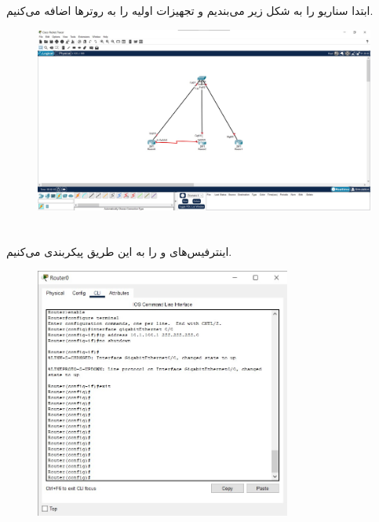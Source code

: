 \documentclass{article}
\begin{document}


\newpage



\section{}%
ابتدا سناریو را به شکل زیر می‌بندیم و تجهیزات اولیه را به روترها اضافه می‌کنیم.
\begin{figure}[H]
    \centering
    \includegraphics[width=1.0\textwidth]{figures/1.jpg}
    \caption{}
    \label{fig:fig1}
\end{figure}


\section{}%
اینترفیس‌های  و  را به این طریق پیکربندی می‌کنیم.
\begin{figure}[H]
    \centering
    \includegraphics[width=0.75\textwidth]{figures/2.jpg}
    \caption{}
    \label{fig:fig1}
\end{figure}
\end{document}
